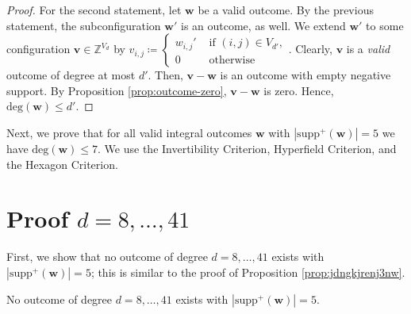 \begin{proof}
    For the second statement, let \( \mathbf{w} \) be a valid outcome. By the previous statement, the subconfiguration \( \mathbf{w}' \) is an outcome, as well. We extend \( \mathbf{w}' \) to some configuration \( \mathbf{v} \in \mathbb{Z}^{V_d} \) by \( v_{i,j} \coloneqq \begin{cases}
        w_{i,j}' & \text{ if } (i,j) \in V_{d'}, \\
        0 & \text{ otherwise}
    \end{cases} \).
    Clearly, \( \mathbf{v} \) is a \emph{valid} outcome of degree at most \( d' \). Then, \( \mathbf{v} - \mathbf{w} \) is an outcome with empty negative support. By Proposition \ref{prop:outcome-zero}, \(  \mathbf{v} - \mathbf{w} \) is zero. Hence, \( \mathrm{deg}(\mathbf{w}) \leq d' \).
\end{proof}



Next, we prove that for all valid integral outcomes \( \mathbf w \) with \( |\mathrm{supp}^+(\mathbf w)| = 5 \) we have \( \mathrm{deg}(\mathbf w) \leq 7 \). We use the Invertibility Criterion, Hyperfield Criterion, and the Hexagon Criterion.

\section{Proof \( d = 8, \dots, 41 \)}

First, we show that no outcome of degree \( d = 8, \dots, 41 \) exists with \( |\mathrm{supp}^+(\mathbf w)| = 5 \); this is similar to the proof of Proposition \ref{prop:jdngkjrenj3nw}.


\begin{proposition}\label{prop:uiwuwinca}
    No outcome of degree \( d = 8, \dots, 41 \) exists with \( |\mathrm{supp}^+(\mathbf w)| = 5 \).
\end{proposition}

